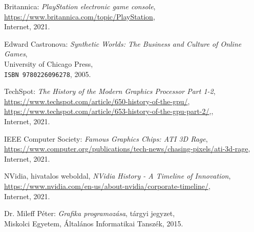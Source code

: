 \begin{thebibliography}{x}
	
	Britannica: \emph{PlayStation electronic game console}, \\
	\url{https://www.britannica.com/topic/PlayStation}, \\
	Internet, 2021.
	
	Edward Castronova: \emph{Synthetic Worlds: The Business and Culture of Online Games}, \\
	University of Chicago Press, \\
	\texttt{ISBN 9780226096278}, 2005.	
	
	TechSpot: \emph{The History of the Modern Graphics Processor Part 1-2}, \\
	\url{https://www.techspot.com/article/650-history-of-the-gpu/}, \\
	\url{https://www.techspot.com/article/653-history-of-the-gpu-part-2/},, \\
	Internet, 2021.
	
	IEEE Computer Society: \emph{Famous Graphics Chips: ATI 3D Rage}, \\
	\url{https://www.computer.org/publications/tech-news/chasing-pixels/ati-3d-rage}, \\
	Internet, 2021.
	
	NVidia, hivatalos weboldal, \emph{NVidia History - A Timeline of Innovation}, \\
	\url{https://www.nvidia.com/en-us/about-nvidia/corporate-timeline/}, \\
	Internet, 2021.
	
	Dr. Mileff Péter: \emph{Grafika programozása}, tárgyi jegyzet, \\
	Miskolci Egyetem, Általános Informatikai Tanszék, 2015.
	

\end{thebibliography}
